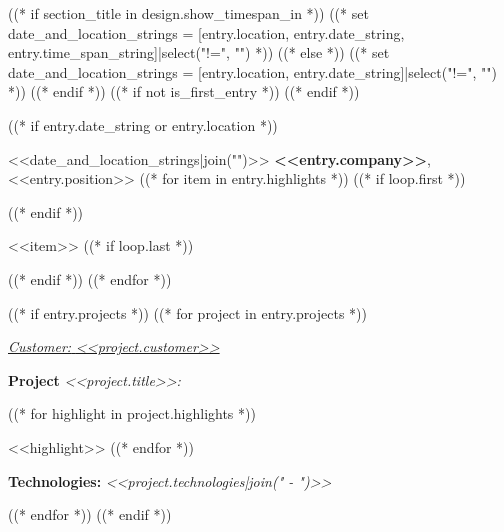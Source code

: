 ((* if section_title in design.show_timespan_in *))
    ((* set date_and_location_strings = [entry.location, entry.date_string, entry.time_span_string]|select("!=", "") *))
((* else *))
    ((* set date_and_location_strings = [entry.location, entry.date_string]|select("!=", "") *))
((* endif *))
((* if not is_first_entry *))
\vspace{<<design.margins.entry_area.vertical_between>>}
((* endif *))

((* if entry.date_string or entry.location *))
\begin{twocolentry}{
    \fontsize{14}{18}<<date_and_location_strings|join("\n\n")>>
    \normalsize
}
    \fontsize{12}{16}
    \textcolor{secondaryColor}{\faBriefcase\hspace{4pt}\textbf{<<entry.company>>},} <<entry.position>>
    \normalsize
    ((* for item in entry.highlights *))
        ((* if loop.first *))
    \begin{highlights}
        ((* endif *))
        \item <<item>>
        ((* if loop.last *))
    \end{highlights}
        ((* endif *))
    ((* endfor *))

    ((* if entry.projects *))
    \vspace{<<design.margins.projects_area.vertical_between_projects>>}
    ((* for project in entry.projects *))
        \vspace{<<design.margins.projects_area.vertical_between_projects>>}

        \textcolor{tertiaryColor}{\faAngleDoubleRight\hspace{0.1cm}\underline{\textit{Customer:} \textit{<<project.customer>>}}}

        \vspace{0.2cm}
        \textbf{Project \faAngleRight} \textit{<<project.title>>:}

        \begin{highlights}
            ((* for highlight in project.highlights *))
                \item <<highlight>>
            ((* endfor *))
        \end{highlights}
        \faBuffer
        \textbf{ Technologies:} \textit{<<project.technologies|join(" - ")>>}

        \vspace{<<design.margins.projects_area.vertical_between_projects>>}

    ((* endfor *))
    ((* endif *))
\end{twocolentry}
